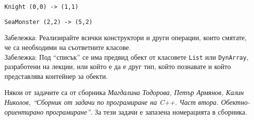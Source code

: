 \documentclass[12pt,a4paper]{article}
\newcommand{\code}[1]{\texttt{#1}}
\begin{document}
\begin{enumerate}
\begin{enumerate}
		\code{Knight (0,0) -> (1,1)}

		\code{SeaMonster (2,2) -> (5,2)}

		\begin{flushleft}
		Забележка: Реализирайте всички конструктори и други операции, които смятате, че са необходими на съответните класове.\\

		Забележка: Под ``списък'' се има предвид обект от класовете \code{List} или \code{DynArray}, разработени на лекции, или който е да е друг тип, който познавате и който представлява контейнер за обекти.
			
		\end{flushleft}

	\end{enumerate}





	\end{enumerate}


	\vspace{20px}

\small{Някои от задачите са от сборника \textit{Магдалина Тодорова, Петър Армянов, Калин Николов, ``Сборник от задачи по програмиране на C++. Част втора. Обектно-ориентирано програмиране''}. За тези задачи е запазена номерацията в сборника.}
\end{document}
